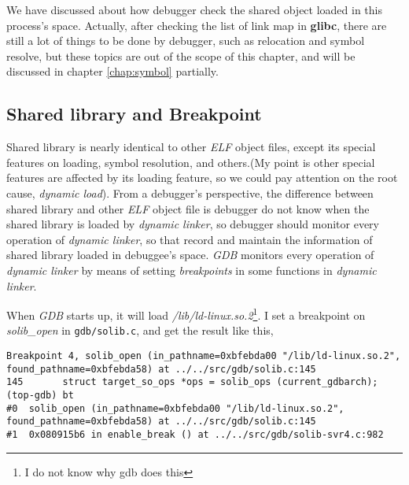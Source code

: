 \documentclass[12pt]{book}
\begin{document}
\begin{CJK}{UTF8}{gbsn}
We have discussed about how debugger check the shared object loaded in this process's space.  Actually, after checking the list of link map in \textbf{glibc},
there are still a lot of things to be done by debugger, such as relocation and symbol resolve, but these topics are out of the scope of this chapter, and
will be discussed in chapter \ref{chap:symbol} partially. 

\subsection{Shared library and Breakpoint}
Shared library is nearly identical to other \emph{ELF} object files, except its special features on loading, symbol
resolution, and others.(My point is other special features are affected by its loading feature, so we could pay attention
on the root cause, \emph{dynamic load}).  From a debugger's perspective, the difference between shared library and other \emph{ELF}
object file is debugger do not know when the shared library is loaded by \emph{dynamic linker}, so debugger should monitor
every operation of \emph{dynamic linker}, so that record and maintain the information of shared library loaded in debuggee's space.
\emph{GDB} monitors every operation of \emph{dynamic linker} by means of setting \emph{breakpoints} in some functions in \emph{dynamic linker}.


When \emph{GDB} starts up, it will load \emph{/lib/ld-linux.so.2}\footnote{I do not know why gdb does this}.  I set a breakpoint on 
\emph{solib\_open} in \texttt{gdb/solib.c}, and get the result like this,

\begin{verbatim}
Breakpoint 4, solib_open (in_pathname=0xbfebda00 "/lib/ld-linux.so.2", found_pathname=0xbfebda58) at ../../src/gdb/solib.c:145
145       struct target_so_ops *ops = solib_ops (current_gdbarch);
(top-gdb) bt
#0  solib_open (in_pathname=0xbfebda00 "/lib/ld-linux.so.2", found_pathname=0xbfebda58) at ../../src/gdb/solib.c:145
#1  0x080915b6 in enable_break () at ../../src/gdb/solib-svr4.c:982
\end{verbatim}


\end{CJK}
\end{document}
